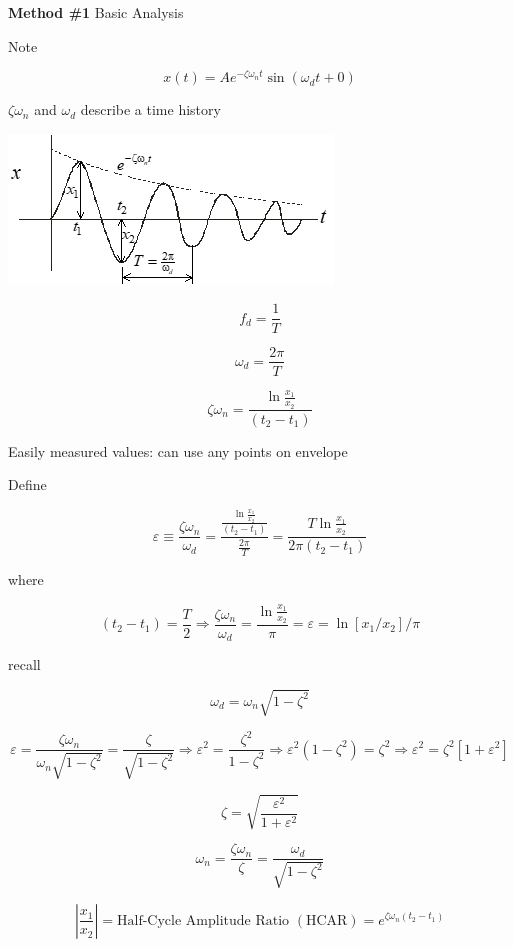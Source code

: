 \documentclass[
]{book}
\begin{document}
\textbf{Method \#1} Basic Analysis

Note

\[ x\left(t\right) = A e^{-\zeta \omega_n t} \sin \left( \omega_d t + 0 \right) \]

\(\zeta \omega_n\) and \(\omega_d\) describe a time history

\includegraphics{media/08/image58.png}

\[f_d = \frac{1}{T}\]

\[\omega_d = \frac{2\pi}{T} \]

\[\zeta \omega_n = \frac{\ln \frac{x_1}{x_2}}{\left(t_2 - t_1 \right)} \]

Easily measured values: can use any points on envelope

Define

\[\varepsilon \equiv \frac{\zeta \omega_n}{\omega_d} = \frac{\frac{\ln \frac{x_1}{x_2}}{\left(t_2 - t_1 \right)} }{\frac{2\pi}{T}} = \frac{T\ln \frac{x_1}{x_2}}{2\pi \left(t_2 - t_1 \right)} \]

where

\[ \left(t_2 - t_1 \right) = \frac{T}{2} \Rightarrow \frac{\zeta \omega_n}{\omega_d} = \frac{\ln \frac{x_1}{x_2}}{\pi} = \varepsilon = \ln \left[ x_1 / x_2 \right] / \pi \]

recall

\[\omega_d = \omega_n \sqrt{1 - \zeta^2} \]

\[\varepsilon = \frac{\zeta \omega_n}{\omega_n \sqrt{1 - \zeta^2}} =  \frac{\zeta}{ \sqrt{1 - \zeta^2}} \Rightarrow \varepsilon^2 = \frac{\zeta^2}{ 1 - \zeta^2} \Rightarrow \varepsilon^2 \left( 1 - \zeta^2 \right) = \zeta^2 \Rightarrow \varepsilon^2 = \zeta^2 \left[ 1 + \varepsilon^2 \right] \]

\[ \zeta = \sqrt{\frac{\varepsilon^2}{1 + \varepsilon^2}} \]

\[\omega_n = \frac{\zeta \omega_n}{\zeta} = \frac{\omega_d}{\sqrt{1 - \zeta^2}} \]

\[ \left| \frac{x_1}{x_2} \right| = \text{Half-Cycle Amplitude Ratio } \left( \mathrm{HCAR} \right) = e^{\zeta \omega_n \left(t_2 - t_1\right)}\]
\end{document}
